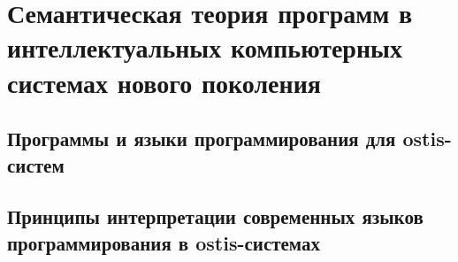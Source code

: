 \chapter{Семантическая теория программ в интеллектуальных компьютерных системах нового поколения}
\label{chapter_programs}


\section{Программы и языки программирования для ostis-систем}
\section{Принципы интерпретации современных языков программирования в ostis-системах}

%